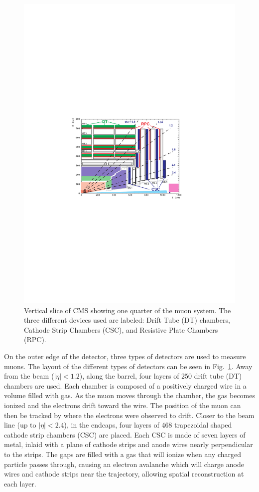 \begin{figure}[htbp]
\begin{center}
\includegraphics[width=.7\linewidth]{Experiment/figures/MuonSystem.pdf}
\caption[Arrangement of Detectors in CMS Muon System]{Vertical slice of CMS showing one quarter of the muon system. The three different devices used are labeled: Drift Tube (DT) chambers, Cathode Strip Chambers (CSC), and Resistive Plate Chambers (RPC).}
\label{fig:MuonSystem}
\end{center}
\end{figure}

On the outer edge of the detector, three types of detectors are used to measure muons. The layout of the different types of detectors can be seen in Fig.~\ref{fig:MuonSystem}. Away from the beam ($|\eta|<1.2$), along the barrel, four layers of 250 drift tube (DT) chambers are used. Each chamber is composed of a positively charged wire in a volume filled with gas. As the muon moves through the chamber, the gas becomes ionized and the electrons drift toward the wire. The position of the muon can then be tracked by where the electrons were observed to drift. Closer to the beam line (up to $|\eta|<2.4$), in the endcaps, four layers of 468 trapezoidal shaped cathode strip chambers (CSC) are placed. Each CSC is made of seven layers of metal, inlaid with a plane of cathode strips and anode wires nearly perpendicular to the strips. The gaps are filled with a gas that will ionize when any charged particle passes through, causing an electron avalanche which will charge anode wires and cathode strips near the trajectory, allowing spatial reconstruction at each layer.

